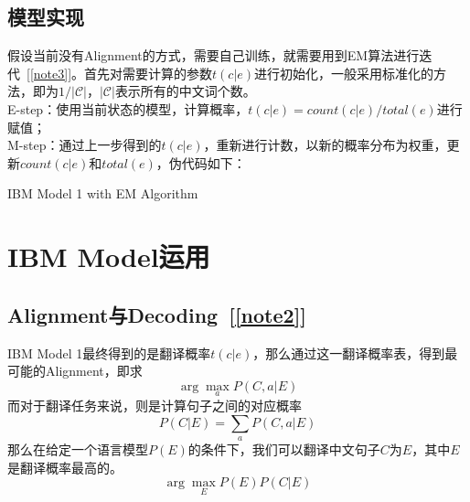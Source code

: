 \documentclass[11pt]{article}
\begin{document}
\subsection{模型实现}
\hspace{1.6em} 假设当前没有Alignment的方式，需要自己训练，就需要用到EM算法进行迭代~[\ref{note3}]。首先对需要计算的参数$t(c|e)$进行初始化，一般采用标准化的方法，即为$1/|\mathcal{C}|$，$|\mathcal{C}|$表示所有的中文词个数。\\
\indent E-step：使用当前状态的模型，计算概率，$t(c|e)=count(c|e)/total(e)$进行赋值；\\
\indent M-step：通过上一步得到的$t(c|e)$，重新进行计数，以新的概率分布为权重，更新$count(c|e)$和$total(e)$，伪代码如下：

\begin{algorithm}
\caption{IBM Model 1 with EM Algorithm}
    \begin{algorithmic}
        \Repeat
                \EndFor
            \EndFor
                \EndFor
            \EndFor
        \EndFor
            \EndFor
        \EndFor
    \end{algorithmic}
\end{algorithm}

\section{IBM Model运用}
\subsection{Alignment与Decoding~[\ref{note2}]}
\hspace{1.6em} IBM Model 1最终得到的是翻译概率$t(c|e)$，那么通过这一翻译概率表，得到最可能的Alignment，即求
\begin{equation}\label{argmaxP}
\arg\max\limits_{a} P(C,a|E)
\end{equation}
\hspace{1.6em} 而对于翻译任务来说，则是计算句子之间的对应概率
\begin{equation}\label{tranlation1}
P(C|E) = \sum_{a}P(C,a|E)
\end{equation}
\hspace{1.6em} 那么在给定一个语言模型$P(E)$的条件下，我们可以翻译中文句子$C$为$E$，其中$E$是翻译概率最高的。
\begin{equation}\label{tranlation2}
\arg\max\limits_{E} P(E)P(C|E)
\end{equation}
\end{document}
